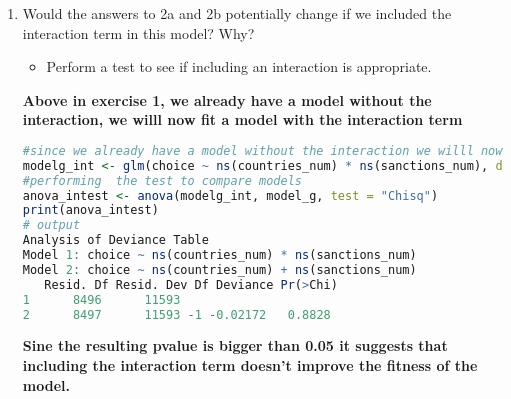 \documentclass[12pt,letterpaper]{article}
\begin{document}
\begin{enumerate}
\begin{enumerate}
\begin{lstlisting}[language=R]
# defining scenario 3
scenario3 <- data.frame(countries_num = 80, sanctions_num = 0)
# predicting the probability of support 
prob_support <- predict(model_g, newdata = scenario3, type = "response")
print(prob_support)
# the probability is 0.537
\end{lstlisting}
\textbf{The estimated probability is 0.537}
		\item
		Would the answers to 2a and 2b potentially change if we included the interaction term in this model? Why? 
		\begin{itemize}
			\item Perform a test to see if including an interaction is appropriate.
		\end{itemize}
\textbf{Above in exercise 1, we already have a model without the interaction, we willl now fit a model with the interaction term}
\begin{lstlisting}[language=R]
#since we already have a model without the interaction we willl now fit a model with the interaction term
modelg_int <- glm(choice ~ ns(countries_num) * ns(sanctions_num), data = climateSupport, family = binomial(link = "logit"))
#performing  the test to compare models
anova_intest <- anova(modelg_int, model_g, test = "Chisq")
print(anova_intest)
# output
Analysis of Deviance Table
Model 1: choice ~ ns(countries_num) * ns(sanctions_num)
Model 2: choice ~ ns(countries_num) + ns(sanctions_num)  
   Resid. Df Resid. Dev Df Deviance Pr(>Chi)
1      8496      11593                     
2      8497      11593 -1 -0.02172   0.8828
\end{lstlisting}
\textbf{Sine the resulting pvalue is bigger than 0.05 it suggests that including the interaction term doesn't improve the fitness of the model.}
	\end{enumerate}
	\end{enumerate}
\end{document}
